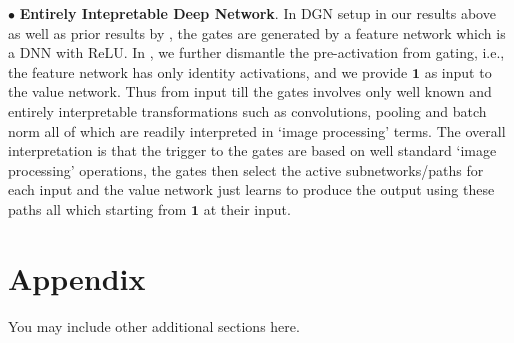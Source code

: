 \documentclass{article} %
\begin{document}
$\bullet$ \textbf{Entirely Intepretable Deep Network}. In DGN setup in our results above as well as prior results by \cite{npk}, the gates are generated by a feature network which is a DNN with ReLU. In , we further dismantle the pre-activation from gating, i.e., the feature network has only identity activations, and we provide $\mathbf{1}$ as input to the value network. Thus from input till the gates involves only well known and entirely interpretable transformations such as convolutions, pooling and batch norm all of which are readily interpreted in `image processing' terms. The overall interpretation is that the trigger to the gates are based on well standard `image processing' operations, the gates then select the active subnetworks/paths for each input and the value network just learns to produce the output using these paths all which starting from $\mathbf{1}$ at their input.



















\appendix
\section{Appendix}
You may include other additional sections here.
\end{document}
